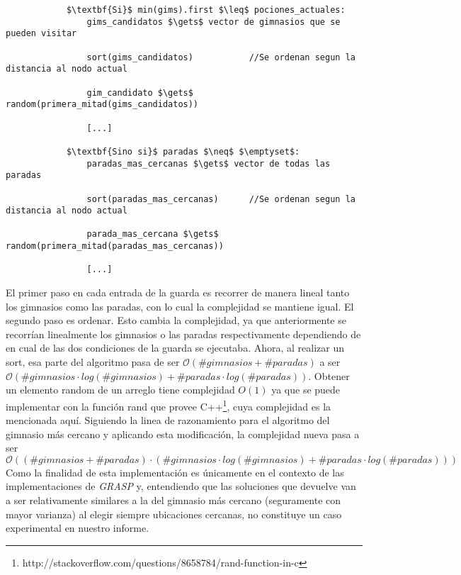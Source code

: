         \begin{lstlisting}
            $\textbf{Si}$ min(gims).first $\leq$ pociones_actuales:
                gims_candidatos $\gets$ vector de gimnasios que se pueden visitar

                sort(gims_candidatos)           //Se ordenan segun la distancia al nodo actual

                gim_candidato $\gets$ random(primera_mitad(gims_candidatos))

                [...]

            $\textbf{Sino si}$ paradas $\neq$ $\emptyset$:
                paradas_mas_cercanas $\gets$ vector de todas las paradas

                sort(paradas_mas_cercanas)      //Se ordenan segun la distancia al nodo actual

                parada_mas_cercana $\gets$ random(primera_mitad(paradas_mas_cercanas))

                [...]

        \end{lstlisting}

    El primer paso en cada entrada de la guarda es recorrer de manera lineal tanto los gimnasios como las paradas, con lo cual la complejidad se mantiene igual. El segundo paso es ordenar. Esto cambia la complejidad, ya que anteriormente se recorrían linealmente los gimnasios o las paradas respectivamente dependiendo de en cual de las dos condiciones de la guarda se ejecutaba. Ahora, al realizar un sort, esa parte del algoritmo pasa de ser $\mathcal{O}(\#gimnasios + \#paradas)$ a ser $\mathcal{O}(\#gimnasios \cdot log(\#gimnasios) + \#paradas \cdot log(\#paradas))$. Obtener un elemento random de un arreglo tiene complejidad $O(1)$ ya que se puede implementar con la función rand que provee C++\footnote{http://stackoverflow.com/questions/8658784/rand-function-in-c}, cuya complejidad es la mencionada aquí. Siguiendo la linea de razonamiento para el algoritmo del gimnasio más cercano y aplicando esta modificación, la complejidad nueva pasa a ser $\mathcal{O}((\#gimnasios + \#paradas) \cdot (\#gimnasios \cdot log(\#gimnasios) + \#paradas \cdot log(\#paradas)))$
    \\

    Como la finalidad de esta implementación es únicamente en el contexto de las implementaciones de \emph{GRASP} y, entendiendo que las soluciones que devuelve van a ser relativamente similares a la del gimnasio más cercano (seguramente con mayor varianza) al elegir siempre ubicaciones cercanas, no constituye un caso experimental en nuestro informe.
